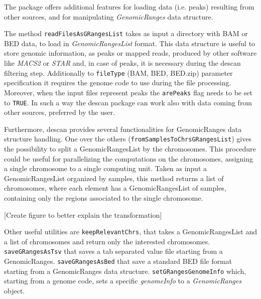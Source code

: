 The package offers additional features for loading data (i.e. peaks) resulting from other sources, and for manipulating \textit{GenomicRanges} data structure.

The method \lstinline{readFilesAsGRangesList} takes as input a directory with BAM or BED data, to load in \textit{GenomicRangesList} format.
This data structure is useful to store genomic information, as peaks or mapped reads, produced by other software like \textit{MACS2} or \textit{STAR} and, in case of peaks, it is necessary during the \gls{descan} filtering step.
Additionally to \lstinline{fileType} (BAM, BED, BED.zip) parameter specification it requires the genome code to use during the file processing.
Moreover, when the input files represent peaks the \lstinline{arePeaks} flag needs to be set to \lstinline{TRUE}.
In such a way the \gls{descan} package can work also with data coming from other sources, preferred by the user.

Furthermore, \gls{descan} provides several functionalities for GenomicRanges data structure
handling. One over the others (\lstinline{fromSamplesToChrsGRangesList}) gives the possibility to split a GenomicRangesList by the chromosomes. 
This procedure could be useful for parallelizing the computations on the chromosomes, assigning a single chromosome to a single computing unit.
Taken as input a GenomicRangesList organized by samples, this method returns a list of chromosomes, where each element has a GenomicRangesList of samples, containing only the regions associated to the single chromosome.

[Create figure to better explain the transformation]

Other useful utilities are \lstinline{keepRelevantChrs}, that takes a GenomicRangesList and a list of chromosomes and return only the interested chromosomes.
\lstinline{saveGRangesAsTsv} that saves a tab separated value file starting from a GenomicRanges.
\lstinline{saveGRangesAsBed} that save a standard BED file format starting from a GenomicRanges data structure.
\lstinline{setGRangesGenomeInfo} which, starting from a genome code, sets a specific \textit{genomeInfo} to a \textit{GenomicRanges} object.